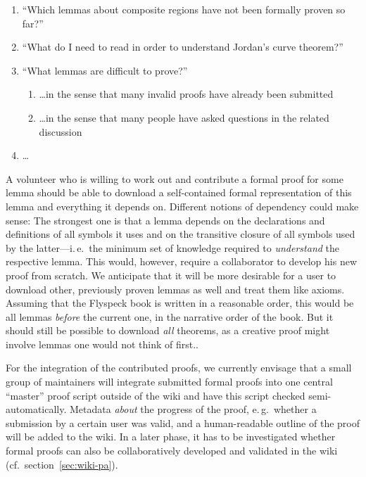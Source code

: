 \documentclass{llncs}
\begin{document}
\begin{enumerate}
\item\label{item:proven-lemma} ``Which lemmas about composite regions have not been
  formally proven so far?''
\item ``What do I need to read in order to understand Jordan's curve
  theorem?''
\item ``What lemmas are difficult to prove?''
  \begin{enumerate}
  \item \ldots in the sense that many invalid proofs have already been submitted
  \item\label{item:question-count} \ldots in the sense that many people have asked
    questions in the related discussion
  \end{enumerate}
\item \ldots{}
\end{enumerate}

A volunteer who is willing to work out and contribute a formal proof for some lemma should
be able to download a self-contained formal representation of this lemma and everything it
depends on.  Different notions of dependency could make sense: The strongest one is that a
lemma depends on the declarations and definitions of all symbols it uses and on the
transitive closure of all symbols used by the latter---i.\,e.\ the minimum set of
knowledge required to \emph{understand} the respective lemma.  This would, however,
require a collaborator to develop his new proof from scratch.  We anticipate that it will
be more desirable for a user to download other, previously proven
lemmas
as well and treat them like axioms.  Assuming that the Flyspeck book is
written in a reasonable order, this would be all lemmas \emph{before} the current one, in
the narrative order of the book.  But it should still be possible to download \emph{all}
theorems, as a creative proof might involve lemmas one would not think of
first..

For the integration of the contributed proofs, we currently envisage that a small group of
maintainers will integrate submitted formal proofs into one central ``master'' proof
script outside of the wiki and have this script checked semi-automatically.  Metadata
\emph{about} the progress of the proof, e.\,g.\ whether a submission by a certain user was
valid, and a human-readable outline of the proof will be added to the wiki.
In a later phase, it has to be investigated whether formal proofs can also be
collaboratively developed and validated in the wiki (cf.\ section~\ref{sec:wiki-pa}).
\end{document}
